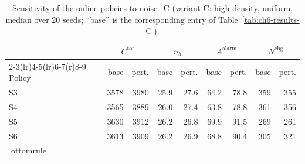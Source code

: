 \begin{table}[htbp]
\centering
\caption{Sensitivity of the online policies to noise_C (variant C: high density, uniform,
median over 20 seeds; ``base'' is the corresponding entry of
Table~\ref{tab:ch6-results-C}).}
\label{tab:ch6-sens-C-noise}
\footnotesize
\begin{tabular}{@{}l rr rr rr rr@{}}
\toprule
& \multicolumn{2}{c}{$C^{\mathrm{tot}}$} & \multicolumn{2}{c}{$n_b$}
  & \multicolumn{2}{c}{$A^{\mathrm{alarm}}$} & \multicolumn{2}{c}{$N^{\mathrm{chg}}$} \\
\cmidrule(r){2-3}\cmidrule(lr){4-5}\cmidrule(lr){6-7}\cmidrule(r){8-9}
Policy & base & pert. & base & pert. & base & pert. & base & pert. \\
\midrule

S3 & 3578 & 3980 & 25.9 & 27.6 & 64.2 & 78.8 & 359 & 355 \\
S4 & 3565 & 3889 & 26.0 & 27.4 & 63.8 & 78.8 & 361 & 356 \\
S5 & 3630 & 3912 & 26.2 & 26.8 & 69.9 & 91.5 & 269 & 261 \\
S6 & 3613 & 3909 & 26.2 & 26.9 & 68.8 & 90.4 & 305 & 321 \\
ottomrule
\end{tabular}
\end{table}
